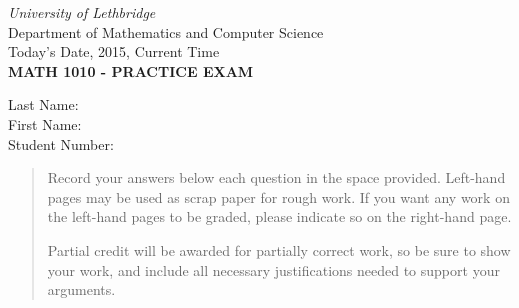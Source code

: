 \documentclass[12pt]{article}
\newcommand{\skipline}{\vspace{12pt}}
\begin{document}
\author{Instructor: Sean Fitzpatrick}
\thispagestyle{plain}
\begin{center}
\emph{University of Lethbridge}\\
Department of Mathematics and Computer Science\\
Today's Date, 2015, Current Time\\
{\bf MATH 1010 - PRACTICE EXAM}\\
\end{center}
\skipline \skipline \skipline \noindent \skipline
Last Name:\underline{\hspace{350pt}}\\
\skipline
First Name:\underline{\hspace{348pt}}\\
\skipline
Student Number:\underline{\hspace{322pt}}\\
\skipline

\vspace{0.5in}


\begin{quote}

 
 Record your answers below each question in the space provided.    Left-hand pages may be used as scrap paper for rough work.  If you want any work on the left-hand pages to be graded, please indicate so on the right-hand page.
 
 \bigskip
 
Partial credit will be awarded for partially correct work, so be sure to show your work, and include all necessary justifications needed to support your arguments. 

\bigskip

\end{quote}


\vspace{0.25in}

\end{document}
